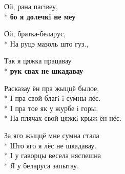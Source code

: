 \medskip

\begin{minipage}{\linewidth}
\hspace*{1.5em}Ой, рана пасiвеу,\\*
\hspace*{1.5em}\textbf{бо я долечкi не меу}\\
\end{minipage}\par\medskip\nobreak

\medskip

\begin{minipage}{\linewidth}
\hspace*{1.5em}Ой, братка-беларус,\\*
\hspace*{1.5em}На руцэ мазоль што гуз.,\\
\end{minipage}\par\medskip\nobreak

\medskip

\begin{minipage}{\linewidth}
\hspace*{1.5em}Так я цяжка працавау\\*
\hspace*{1.5em}\textbf{рук свах не шкадавау}\\
\end{minipage}\par\medskip\nobreak

\medskip

\begin{minipage}{\linewidth}
Расказау ён пра жыццё былое,\\*
I пра свой благi i сумны лёс.\\*
I пра тое як у журбе i горы,\\*
На плячах свой цяжкi крыж ён нёс.\\
\end{minipage}\par\medskip\nobreak

\medskip

\begin{minipage}{\linewidth}
За яго жыццё мне сумна стала\\*
Што яго я лёс не шкадавау.\\*
I у гаворцы весела няспешна\\*
Я у беларуса запытау.\\
\end{minipage}\par\medskip\nobreak


